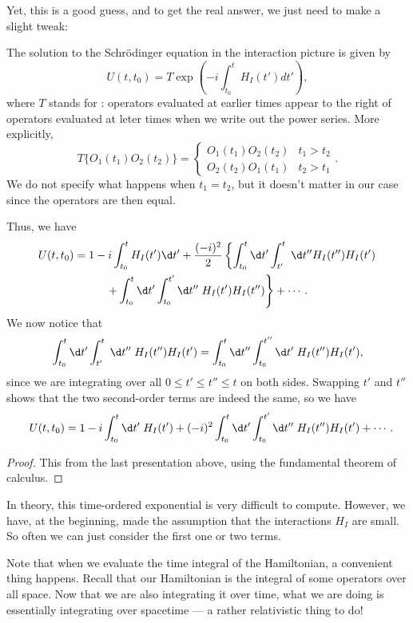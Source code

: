 \documentclass[a4paper]{article}
\begin{document}
Yet, this is a good guess, and to get the real answer, we just need to make a slight tweak:
\begin{prop}
  The solution to the Schr\"odinger equation in the interaction picture is given by
  \[
    U(t, t_0) = T\exp\left(-i \int_{t_0}^t H_I(t') dt'\right),
  \]
  where $T$ stands for : operators evaluated at earlier times appear to the right of operators evaluated at leter times when we write out the power series. More explicitly,
  \[
    T\{O_1(t_1) O_2(t_2)\} =
    \begin{cases}
      O_1(t_1) O_2(t_2) & t_1 > t_2\\
      O_2(t_2) O_1(t_1) & t_2 > t_1
    \end{cases}.
  \]
  We do not specify what happens when $t_1 = t_2$, but it doesn't matter in our case since the operators are then equal.

  Thus, we have
  \begin{multline*}
    U(t, t_0) = 1 - i \int_{t_0}^t H_I (t') \d t' + \frac{(-i)^2}{2} \left\{\int_{t_0}^t \d t' \int_{t'}^t\;\d t'' H_I(t'') H_I(t')\right.\\
    \left.+ \int_{t_0}^t \d t' \int_{t_0}^{t'} \d t''\; H_I(t') H_I(t'')\right\} + \cdots.
  \end{multline*}
  We now notice that
  \[
    \int_{t_0}^t \d t' \int_{t'}^t \;\d t''\; H_I(t'') H_I(t') = \int_{t_0}^t \d t'' \int_{t_0}^{t''}\d t'\; H_I(t'') H_I(t'),
  \]
  since we are integrating over all $0 \leq t' \leq t'' \leq t$ on both sides. Swapping $t'$ and $t''$ shows that the two second-order terms are indeed the same, so we have
  \[
    U(t, t_0) = 1 - i \int_{t_0}^t \d t' \; H_I (t') + (-i)^2 \int_{t_0}^t \d t' \int_{t_0}^{t'} \d t'' \; H_I(t'') H_I(t') + \cdots.
  \]
\end{prop}

\begin{proof}
  This from the last presentation above, using the fundamental theorem of calculus.
\end{proof}

In theory, this time-ordered exponential is very difficult to compute. However, we have, at the beginning, made the assumption that the interactions $H_I$ are small. So often we can just consider the first one or two terms.

Note that when we evaluate the time integral of the Hamiltonian, a convenient thing happens. Recall that our Hamiltonian is the integral of some operators over all space. Now that we are also integrating it over time, what we are doing is essentially integrating over spacetime --- a rather relativistic thing to do!
\end{document}
